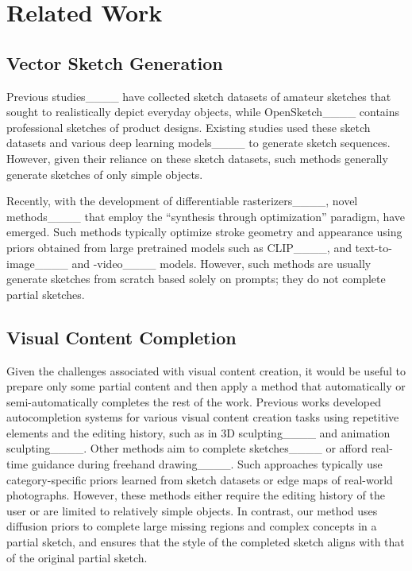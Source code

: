 \section{Related Work}
\label{sec:related}
\subsection{Vector Sketch Generation}
Previous studies____ have collected sketch datasets of amateur sketches that sought to realistically depict everyday objects, while OpenSketch____ contains professional sketches of product designs.
Existing studies used these sketch datasets and various deep learning models____ to generate sketch sequences.
However, given their reliance on these sketch datasets, such methods generally generate sketches of only simple objects.

Recently, with the development of differentiable rasterizers____, novel methods____ that employ the ``synthesis through optimization'' paradigm, have emerged.
Such methods typically optimize stroke geometry and appearance using priors obtained from large pretrained models such as CLIP____, and text-to-image____ and -video____ models.
However, such methods are usually generate sketches from scratch based solely on prompts; they do not complete partial sketches.

\subsection{Visual Content Completion}
Given the challenges associated with visual content creation, it would be useful to prepare only some partial content and then apply a method that automatically or semi-automatically completes the rest of the work.
Previous works developed autocompletion systems for various visual content creation tasks using repetitive elements and the editing history, such as in 3D sculpting____ and animation sculpting____.
Other methods aim to complete sketches____ or afford real-time guidance during freehand drawing____.
Such approaches typically use category-specific priors learned from sketch datasets or edge maps of real-world photographs.
However, these methods either require the editing history of the user or are limited to relatively simple objects.
In contrast, our method uses diffusion priors to complete large missing regions and complex concepts in a partial sketch, and ensures that the style of the completed sketch aligns with that of the original partial sketch.



